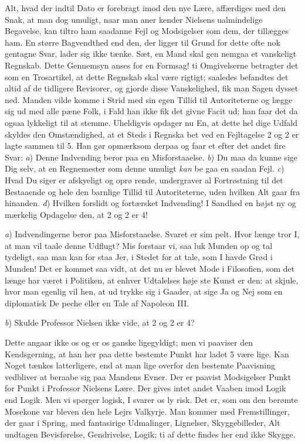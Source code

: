 \documentclass[12pt,a4paper,openany]{book}
\newcommand{\opage}[1]{\marginnote{\footnotesize\textit{[#1]}}}
\begin{document}
Alt, hvad der indtil Dato er forebragt imod den nye Lære,
affærdiges med den Snak, at man dog umuligt, naar man aner\-%
kender Nielsens ualmindelige Begavelse, kan tiltro ham saadanne
Fejl og Modsigelser som dem, der tillægges ham. En større
Bagvendthed end den, der ligger til Grund for dette ofte nok
gentagne Svar, lader sig ikke tænke. Sæt, en Mand skal gen\-%
nemgaa et vanskeligt Regnskab. Dette Gennemsyn anses for en
Formsag! ti Omgivelserne betragter det som en Trosartikel, at
dette Regnskab skal være rigtigt; saaledes befandtes det altid af
de tidligere Revisorer, og gjorde disse Vanskelighed, fik man
Sagen dysset ned. Manden vilde komme i Strid med sin egen
Tillid til Autoriteterne og lægge sig ud med alle pæne Folk, i
Fald han ikke fik det givne Facit ud; han faar det da ogsaa
lykkeligt til at stemme. Uheldigvis opdager nu En, at dette hel\-%
dige Udfald skyldes den Omstændighed, at et Steds i Regnska\-%
bet ved en Fejltagelse 2 og 2 er lagte sammen til 5. Han gør
opmærksom derpaa og faar et efter det andet fire Svar: \emph{a}) Denne
Indvending beror paa en Misforstaaelse. \emph{b}) Du maa da kunne
sige Dig selv, at en Regnemester som denne umuligt \emph{kan} be\-%
gaa en saadan Fejl. \emph{c}) Hvad Du siger er afskyeligt og oprø\-%
rende, undergraver al Fortrøstning til det Bestaaende og hele
den barnlige Tillid til Autoriteterne, uden hvilken Alt gaar fra
hinanden. \emph{d}) Hvilken forslidt og fortærsket Indvending! I
Sandhed en højst ny og mærkelig Opdagelse den, at 2 og 2
er 4!

\emph{a}) Indvendingerne beror paa Misforstaaelse. Svaret er sim\-%
pelt. Hvor længe tror I, at man vil taale denne Udflugt? Mis\-%
forstaar vi, saa luk Munden op og tal tydeligt, saa man kan for\-%
staa Jer, i Stedet for at tale, som I havde Grød i Munden!
Det er kommet saa vidt, at det nu er blevet Mode i Filosofien,
som det længe har været i Politiken, at enhver Udtalelses høje\-%
ste Kunst er den: at skjule, hvor man egenlig vil hen, at ud\-%
trykke sig i Gaader, at sige Ja og Nej som en diplomatisk De\-%
peche eller en Tale af Napoleon III.

\emph{b}) Skulde Professor Nielsen ikke vide, at 2 og 2 er 4?

Dette angaar ikke os og er os ganske ligegyldigt; men vi
paaviser den Kendsgerning, at han her paa dette bestemte Punkt
\opage{95}har ladet 5 være lige. Kan Noget tænkes latterligere, end at
man lige overfor den bestemte Paavisning vedbliver at beraabe
sig paa Mandens Evner. Der er paavist Modsigelser Punkt for
Punkt i Professor Nielsens Lære. Der gives intet andet Vaaben
imod Logik end Logik. Men vi spørger logisk, I svarer os ly\-%
risk. Det er, som om den berømte Mosekone var bleven den
hele Lejrs Valkyrje. Man kommer med Fremstillinger, der gaar
i Spring, med fantasirige Udmalinger, Lignelser, Skyggebilleder,
Alt undtagen Bevisførelse, Gendrivelse, Logik; ti af dette findes
her end ikke Skygge.
\end{document}
